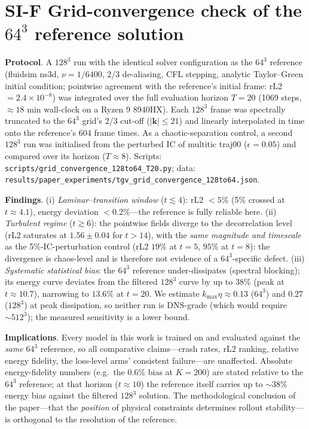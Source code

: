 \documentclass[11pt,a4paper]{article}
\begin{document}
\section*{SI-F \quad Grid-convergence check of the $64^3$ reference solution}

\textbf{Protocol}. A $128^3$ run with the identical solver configuration as the $64^3$ reference (fluidsim ns3d, $\nu=1/6400$, 2/3 de-aliasing, CFL stepping, analytic Taylor--Green initial condition; pointwise agreement with the reference's initial frame: rL2 $=2.4\times10^{-8}$) was integrated over the full evaluation horizon $T=20$ (1069 steps, $\approx18$ min wall-clock on a Ryzen 9 8940HX). Each $128^3$ frame was spectrally truncated to the $64^3$ grid's 2/3 cut-off ($|\bm k|\le21$) and linearly interpolated in time onto the reference's 604 frame times. As a chaotic-separation control, a second $128^3$ run was initialised from the perturbed IC of multitic traj00 ($\epsilon=0.05$) and compared over its horizon ($T\approx8$). Scripts: \texttt{scripts/grid\_convergence\_128to64\_T20.py}; data: \texttt{results/paper\_experiments/tgv\_grid\_convergence\_128to64.json}.

\textbf{Findings}. (i) \emph{Laminar--transition window} ($t\lesssim4$): rL2 $<5\%$ (5\% crossed at $t\approx4.1$), energy deviation $<0.2\%$---the reference is fully reliable here. (ii) \emph{Turbulent regime} ($t\gtrsim6$): the pointwise fields diverge to the decorrelation level (rL2 saturates at $1.56\pm0.04$ for $t>14$), with the \emph{same magnitude and timescale} as the 5\%-IC-perturbation control (rL2 $19\%$ at $t{=}5$, $95\%$ at $t{=}8$): the divergence is chaos-level and is therefore not evidence of a $64^3$-specific defect. (iii) \emph{Systematic statistical bias}: the $64^3$ reference under-dissipates (spectral blocking); its energy curve deviates from the filtered $128^3$ curve by up to $38\%$ (peak at $t\approx10.7$), narrowing to $13.6\%$ at $t{=}20$. We estimate $k_{\max}\eta\approx0.13$ ($64^3$) and $0.27$ ($128^3$) at peak dissipation, so neither run is DNS-grade (which would require ${\sim}512^3$); the measured sensitivity is a lower bound.

\textbf{Implications}. Every model in this work is trained on and evaluated against the \emph{same} $64^3$ reference, so all comparative claims---crash rates, rL2 ranking, relative energy fidelity, the loss-level arms' consistent failure---are unaffected. Absolute energy-fidelity numbers (e.g.\ the $0.6\%$ bias at $K{=}200$) are stated relative to the $64^3$ reference; at that horizon ($t\approx10$) the reference itself carries up to ${\sim}38\%$ energy bias against the filtered $128^3$ solution. The methodological conclusion of the paper---that the \emph{position} of physical constraints determines rollout stability---is orthogonal to the resolution of the reference.
\end{document}
